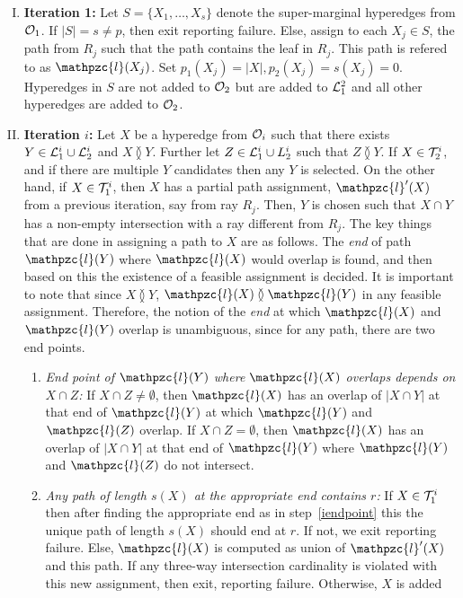 \documentclass[11pt,
               envcountsect,
               envcountsame]
               {../lib/llncs2e/llncs}
\def\cL{{\cal L}}
\def\cO{{\cal O}}
\def\cT{{\cal T}}
\def\cl{\mathpzc{l}}
\def\overlap{\between}
\begin{document}
\noindent
\begin{enumerate}[I.]
\item {\bf Iteration 1:} Let $S=\{X_1,\ldots,X_s\}$ denote the
  super-marginal hyperedges from $\cO_1$.  If $|S|=s \neq p$, then
  exit reporting failure.  Else, assign to each $X_j \in S$, the path
  from $R_j$ such that the path contains the leaf in $R_j$.  This path
  is refered to as $\cl(X_j)$.  Set $p_1(X_j)=|X|, p_2(X_j)=s(X_j)=0$.
  Hyperedges in $S$ are not added to $\cO_2$ but are added to
  $\cL_1^2$ and all other hyperedges are added to
  $\cO_2$.
\item {\bf Iteration $i$:} Let $X$ be a hyperedge from $\cO_i$ such
  that there exists $Y \in \cL_1^i \cup \cL_2^i$ and $X \overlap
  Y$. Further let $Z \in \cL_1^i \cup L_2^i$ such that $Z \overlap Y$.
  If $X \in \cT_2^i$, and if there are multiple $Y$ candidates then
  any $Y$ is selected.  On the other hand, if $X \in \cT_1^i$, then
  $X$ has a partial path assignment, $\cl'(X)$ from a previous
  iteration, say from ray $R_j$. Then, $Y$ is
  chosen such that $X \cap Y$ has a non-empty intersection with a ray
  different from $R_j$.  The key things that are done in assigning a
  path to $X$ are as follows. The {\em end} of path $\cl(Y)$ where
  $\cl(X)$ would overlap is found, and then based on this the
  existence of a feasible assignment is decided.  It is important to
  note that since $X \overlap Y$, $\cl(X) \overlap \cl(Y)$ in any
  feasible assignment.  Therefore, the notion of the {\em end} at
  which $\cl(X)$ and $\cl(Y)$ overlap is unambiguous, since for any
  path, there are two end points.
  \begin{enumerate}
  \item \label{iendpoint} {\em End point of $\cl(Y)$ where $\cl(X)$ overlaps
      depends on $X \cap Z$:} If $X \cap Z
    \neq \emptyset$, then $\cl(X)$ has an overlap of $|X \cap Y|$ at that
    end of $\cl(Y)$ at which $\cl(Y)$ and $\cl(Z)$ overlap.  If $X
    \cap Z = \emptyset$, then $\cl(X)$ has an overlap of $|X \cap Y|$ at
    that end of $\cl(Y)$ where $\cl(Y)$ and $\cl(Z)$ do not intersect.
  \item {\em Any path of length $s(X)$ at the appropriate end contains
      $r$:} If $X \in \cT_1^i$ then after finding the appropriate end
    as in step~\ref{iendpoint} this the unique path of length $s(X)$
    should end at $r$.  If not, we exit reporting failure.  Else,
    $\cl(X)$ is computed as union of $\cl'(X)$ and this path. If any
    three-way intersection cardinality is violated with this new
    assignment, then exit, reporting failure.  Otherwise, $X$ is added

\end{enumerate}
\end{enumerate}
\end{document}
